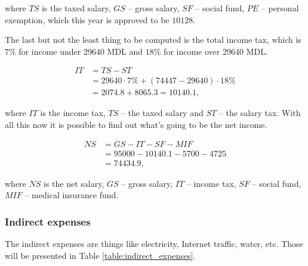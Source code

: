 \noindent
where $TS$ is the taxed salary, $GS$ -- gross salary, $SF$ -- social fund, $PE$ -- personal exemption, which this year is approved to be $10128$.

\clearpage
The last but not the least thing to be computed is the total income tax, which is $7\%$ for income under 29640 MDL and $18\%$ for income over 29640 MDL.

\begin{equation}
\begin{split}
 IT &= TS - ST \\
      &= 29640 \cdot 7\% + (74447 - 29640) \cdot 18\% \\
      & = 2074.8 + 8065.3 = 10140.1,
 \end{split}
\end{equation}

\noindent
where $IT$ is the income tax, $TS$ -- the taxed salary and $ST$ -- the salary tax. With all this now it is possible to find out what's going to be the net income.

\begin{equation}
\begin{split}
 NS &= GS - IT - SF - MIF \\
            &= 95000 - 10140.1 - 5700 - 4725 \\
            &= 74434.9,
\end{split}
\end{equation}

\noindent
where $NS$ is the net salary, $GS$ -- gross salary, $IT$ -- income tax, $SF$ -- social fund, $MIF$ -- medical insurance fund.

\subsubsection{Indirect expenses}
The indirect expenses are things like electricity, Internet traffic, water, etc. Those will be presented in Table \ref{table:indirect_expenses}.

